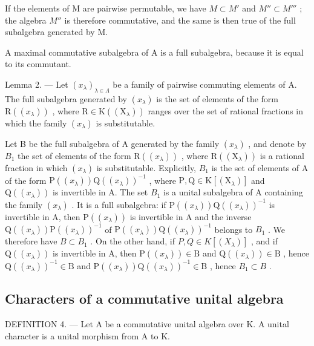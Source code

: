 If the elements of M are pairwise permutable, we have \(M \subset M'\) and \(M'' \subset M'''\) ; the algebra \(M''\) is therefore commutative, and the same is then true of the full subalgebra generated by M.

A maximal commutative subalgebra of A is a full subalgebra, because it is equal to its commutant.

Lemma 2. --- Let \((x_{\lambda})_{\lambda \in \Lambda}\) be a family of pairwise commuting elements of A. The full subalgebra generated by \((x_{\lambda})\) is the set of elements of the form \(\mathrm{R}((x_{\lambda}))\) , where \(\mathrm{R} \in \mathrm{K}((\mathrm{X}_{\lambda}))\) ranges over the set of rational fractions in which the family \((x_{\lambda})\) is substitutable.

Let B be the full subalgebra of A generated by the family \((x_{\lambda})\) , and denote by \(B_{1}\) the set of elements of the form \(\mathrm{R}((x_{\lambda}))\) , where \(\mathrm{R}((\mathrm{X}_{\lambda}))\) is a rational fraction in which \((x_{\lambda})\) is substitutable. Explicitly, \(B_{1}\) is the set of elements of A of the form \(\mathrm{P}((x_{\lambda}))\mathrm{Q}((x_{\lambda}))^{-1}\) , where \(\mathrm{P},\mathrm{Q}\in\mathrm{K}[(\mathrm{X}_{\lambda})]\) and \(\mathrm{Q}((x_{\lambda}))\) is invertible in A. The set \(B_{1}\) is a unital subalgebra of A containing the family \((x_{\lambda})\) . It is a full subalgebra: if \(\mathrm{P}((x_{\lambda}))\mathrm{Q}((x_{\lambda}))^{-1}\) is invertible in A, then \(\mathrm{P}((x_{\lambda}))\) is invertible in A and the inverse \(\mathrm{Q}((x_{\lambda}))\mathrm{P}((x_{\lambda}))^{-1}\) of \(\mathrm{P}((x_{\lambda}))\mathrm{Q}((x_{\lambda}))^{-1}\) belongs to \(B_{1}\) . We therefore have \(B\subset B_{1}\) . On the other hand, if \(P,Q\in K[(X_{\lambda})]\) , and if \(\mathrm{Q}((x_{\lambda}))\) is invertible in A, then \(\mathrm{P}((x_{\lambda}))\in\mathrm{B}\) and \(\mathrm{Q}((x_{\lambda}))\in\mathrm{B}\) , hence \(\mathrm{Q}((x_{\lambda}))^{-1}\in\mathrm{B}\) and \(\mathrm{P}((x_{\lambda}))\mathrm{Q}((x_{\lambda}))^{-1}\in\mathrm{B}\) , hence \(B_{1}\subset B\) .

\subsection{Characters of a commutative unital algebra}

DEFINITION 4. --- Let A be a commutative unital algebra over K. A unital character is a unital morphism from A to K.

